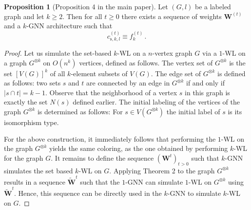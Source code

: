 \documentclass[letterpaper]{article}
\theoremstyle{definition}
\newtheorem{proposition}[theorem]{Proposition}
\begin{document}
\begin{proposition}[Proposition 4 in the main paper]
	Let $(G, l)$ be a labeled graph and let $k\geq 2$. Then for all $t \geq 0$ there exists a sequence of weights $\mathbf{W}^{(t)}$ and a $k$-GNN architecture such that   
	\begin{equation*}
		c^{(t)}_{\text{s},k,l} \equiv f^{(t)}_{k}\,.
	\end{equation*}
\end{proposition}


\begin{proof}
	Let us simulate the set-based $k$-WL on a $n$-vertex graph $G$ 
	via a $1$-WL on a graph $G^{\otimes k}$ on $O(n^k)$ vertices,
	defined as follows. The vertex set of $G^{\otimes k}$ is the 
	set $[V(G)]^k$ of all $k$-element subsets of $V(G)$. 
	The edge set of $G^{\otimes k}$ is defined as follows: two 
	sets $s$ and $t$ are connected by an edge in $G^{\otimes k}$ 
	if and only if $|s \cap t| = k-1$. Observe that the 
	neighborhood of a vertex $s$ in this graph
	is exactly the set $N(s)$ defined earlier. 
	The initial labeling of the vertices of the graph $G^{\otimes k}$ is determined as follows:
	For $s\in V(G^{\otimes k})$ the initial label of $s$ is its isomorphism type.
				
	For the above construction, it immediately follows that 
	performing the $1$-WL on the graph $G^{\otimes k}$ yields the same 
	coloring, as the one obtained by performing $k$-WL for the graph $G$. It remains to define the sequence $(\boldsymbol{W}^{t})_{t>0}$ such that $k$-GNN simulates the set based $k$-WL on $G$. Applying Theorem 2 to the graph $G^{\otimes k}$ results in a 
	sequence $\widetilde{\boldsymbol{W}}^{t}$ such that the $1$-GNN can simulate $1$-WL on $G^{\otimes k}$ using $\widetilde{\boldsymbol{W}}^{t}$. 
	Hence, this sequence can be directly used in the $k$-GNN to simulate $k$-WL on $G$. 
\end{proof}
\end{document}
